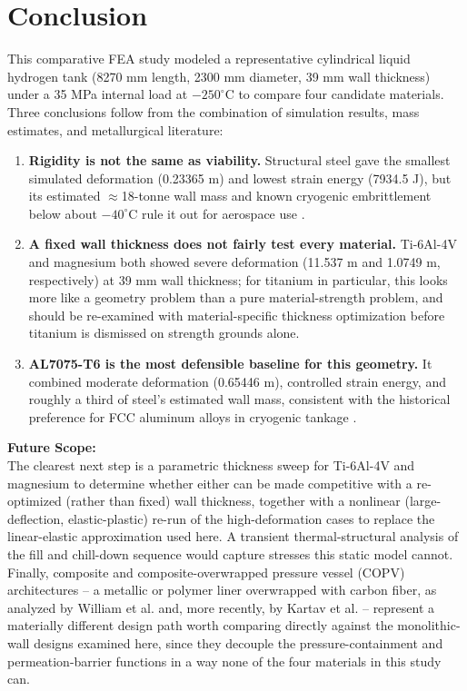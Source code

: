 \documentclass[conference]{IEEEtran}
\begin{document}
\section{Conclusion}
This comparative FEA study modeled a representative cylindrical liquid hydrogen tank (8270 mm length, 2300 mm diameter, 39 mm wall thickness) under a 35 MPa internal load at $-250^{\circ}$C to compare four candidate materials. Three conclusions follow from the combination of simulation results, mass estimates, and metallurgical literature:

\begin{enumerate}
    \item \textbf{Rigidity is not the same as viability.} Structural steel gave the smallest simulated deformation (0.23365 m) and lowest strain energy (7934.5 J), but its estimated $\approx$18-tonne wall mass and known cryogenic embrittlement below about $-40^{\circ}$C rule it out for aerospace use \cite{dieter1986}.
    \item \textbf{A fixed wall thickness does not fairly test every material.} Ti-6Al-4V and magnesium both showed severe deformation (11.537 m and 1.0749 m, respectively) at 39 mm wall thickness; for titanium in particular, this looks more like a geometry problem than a pure material-strength problem, and should be re-examined with material-specific thickness optimization before titanium is dismissed on strength grounds alone.
    \item \textbf{AL7075-T6 is the most defensible baseline for this geometry.} It combined moderate deformation (0.65446 m), controlled strain energy, and roughly a third of steel's estimated wall mass, consistent with the historical preference for FCC aluminum alloys in cryogenic tankage \cite{kaufman1999}.
\end{enumerate}

\vspace{0.5cm}
\noindent \textbf{Future Scope:}\\
The clearest next step is a parametric thickness sweep for Ti-6Al-4V and magnesium to determine whether either can be made competitive with a re-optimized (rather than fixed) wall thickness, together with a nonlinear (large-deflection, elastic-plastic) re-run of the high-deformation cases to replace the linear-elastic approximation used here. A transient thermal-structural analysis of the fill and chill-down sequence would capture stresses this static model cannot. Finally, composite and composite-overwrapped pressure vessel (COPV) architectures -- a metallic or polymer liner overwrapped with carbon fiber, as analyzed by William et al. \cite{william2013} and, more recently, by Kartav et al. \cite{kartav2021} -- represent a materially different design path worth comparing directly against the monolithic-wall designs examined here, since they decouple the pressure-containment and permeation-barrier functions in a way none of the four materials in this study can.
\end{document}
